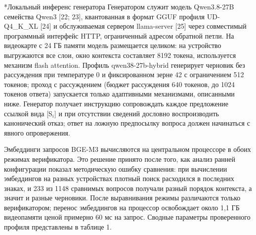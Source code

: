\documentclass[14pt,a4paper]{extarticle}
\makeatletter
\renewcommand\subsection{\@startsection{subsection}{2}{\z@}{8pt plus 2pt}{4pt}{\normalfont\normalsize\bfseries\itshape\raggedright}}
\makeatother
\begin{document}
\subsection*{Локальный инференс генератора}
Генератором служит модель Qwen3.8-27B семейства Qwen3 [22; 23], квантованная в формат GGUF профиля UD-Q4\_K\_XL [24] и обслуживаемая сервером llama-server [25] через совместимый программный интерфейс HTTP, ограниченный адресом обратной петли. На видеокарте с 24 ГБ памяти модель размещается целиком: на устройство выгружаются все слои, окно контекста составляет 8192 токена, используется механизм flash attention. Профиль qwen38-27b-hybrid генерирует черновик без рассуждения при температуре 0 и фиксированном зерне 42 с ограничением 512 токенов; проход с рассуждением (бюджет рассуждения 640 токенов, до 1024 токенов ответа) запускается только адаптивными механизмами, описанными ниже. Генератор получает инструкцию сопровождать каждое предложение ссылкой вида [S$_i$] и при отсутствии сведений дословно воспроизводить канонический отказ; ответ на ложную предпосылку вопроса должен начинаться с явного опровержения.

Эмбеддинги запросов BGE-M3 вычисляются на центральном процессоре в обоих режимах верификатора. Это решение принято после того, как анализ ранней конфигурации показал методическую ошибку сравнения: при вычислении эмбеддингов на разных устройствах плотный поиск расходился в последних знаках, и 233 из 1148 сравнимых вопросов получали разный порядок контекста, а значит и разные черновики. После выравнивания режимы различаются только верификатором; перенос эмбеддингов на процессор освобождает около 1,1 ГБ видеопамяти ценой примерно 60 мс на запрос. Сводные параметры проверенного профиля представлены в таблице 1.
\end{document}
